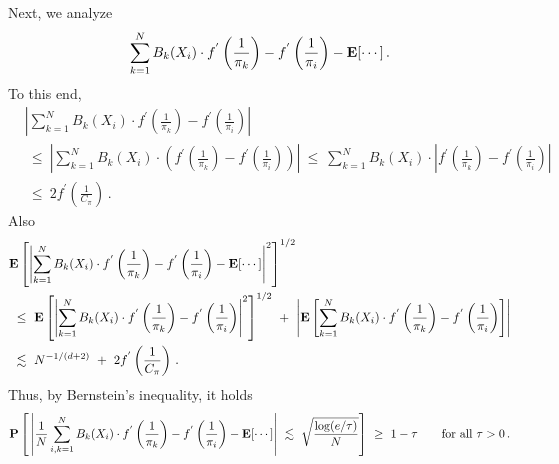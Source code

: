 Next, we analyze 
\begin{gather}
  \sum_{k=1}^{N} 
  B_k(X_i)\cdot
  f^{'}\left( \frac{1}{\pi_k} \right)
  -
  f^{'}\left( \frac{1}{\pi_i} \right)
  -
  \mathbf{E}[\cdots]
  \,.
\end{gather}
To this end,
\begin{align*}
  &
  \left| 
  \sum_{k=1}^{N} 
  B_k(X_i)\cdot
  f^{'}\left( \frac{1}{\pi_k} \right)
  -
  f^{'}\left( \frac{1}{\pi_i} \right)
  \right|
  \\
  &
  \ 
  \le
  \ 
  \left| 
  \sum_{k=1}^{N} 
  B_k(X_i)\cdot
  \left( 
  f^{'}\left( \frac{1}{\pi_k} \right)
  -
  f^{'}\left( \frac{1}{\pi_i} \right)
  \right)
  \right|
  \ 
  \le
  \ 
  \sum_{k=1}^{N} 
  B_k(X_i)\cdot
  \left| 
  f^{'}\left( \frac{1}{\pi_k} \right)
  -
  f^{'}\left( \frac{1}{\pi_i} \right)
  \right|
  \\
  &
  \ 
  \le
  \ 
  2
  f^{'}\left( \frac{1}{C_\pi} \right)
  \,.
\end{align*}
Also
\begin{align*}
  &
  \E
  \left[ 
  \left| 
  \sum_{k=1}^{N} 
  B_k(X_i)\cdot
  f^{'}\left( \frac{1}{\pi_k} \right)
  -
  f^{'}\left( \frac{1}{\pi_i} \right)
  -
  \E[\cdots]
  \right|^2
\right]^{1/2}
\\
  &
  \ 
\le
  \ 
  \E
  \left[ 
  \left| 
  \sum_{k=1}^{N} 
  B_k(X_i)\cdot
  f^{'}\left( \frac{1}{\pi_k} \right)
  -
  f^{'}\left( \frac{1}{\pi_i} \right)
  \right|^2
\right]^{1/2}
  \ 
+
  \ 
\left| 
\E
\left[ 
  \sum_{k=1}^{N} 
  B_k(X_i)\cdot
  f^{'}\left( \frac{1}{\pi_k} \right)
  -
  f^{'}\left( \frac{1}{\pi_i} \right)
\right]
\right|
\\
  &
  \ 
\lesssim
  \ 
N^{-1/(d+2)}
  \ 
+
  \ 
  2
  f^{'}\left( \frac{1}{C_\pi} \right)
  \,.
\end{align*}
Thus, by Bernstein's inequality, it holds
\begin{gather}
   \P
    \left[ 
      \,
      \left| 
      \frac{1}{N}
  \sum_{i,k=1}^{N} 
  B_k(X_i)\cdot
  f^{'}\left( \frac{1}{\pi_k} \right)
  -
  f^{'}\left( \frac{1}{\pi_i} \right)
  -
  \E[\cdots]
      \right|
      \ 
      \lesssim
      \ 
      \sqrt{
        \frac{
        \log (e/\tau)}
      {N}
      }
    \right]
    \ 
    \ge
    \ 
    1-\tau
    \qquad
    \text{for all}\ 
    \tau
    >
    0
    \,.
\end{gather}


